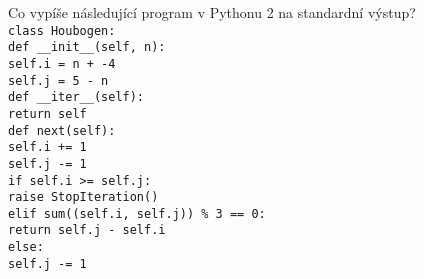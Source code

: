 \documentclass[addpoints,12pt]{exam}
\begin{document}
\begin{questions}
\begin{choices}
\end{choices}
\question[2]
Co vypíše následující program v Pythonu 2 na standardní výstup?\\
\texttt{class Houbogen:\\
\hspace*{0.6cm}def \_{}\_{}init\_{}\_{}(self, n):\\
\hspace*{0.6cm}\hspace*{0.6cm}self.i = n + -4\\
\hspace*{0.6cm}\hspace*{0.6cm}self.j = 5 - n\\
\hspace*{0.6cm}def \_{}\_{}iter\_{}\_{}(self):\\
\hspace*{0.6cm}\hspace*{0.6cm}return self\\
\hspace*{0.6cm}def next(self):\\
\hspace*{0.6cm}\hspace*{0.6cm}self.i += 1\\
\hspace*{0.6cm}\hspace*{0.6cm}self.j -= 1\\
\hspace*{0.6cm}\hspace*{0.6cm}if self.i \textgreater{}= self.j:\\
\hspace*{0.6cm}\hspace*{0.6cm}\hspace*{0.6cm}raise StopIteration()\\
\hspace*{0.6cm}\hspace*{0.6cm}elif sum((self.i, self.j)) \%{} 3 == 0:\\
\hspace*{0.6cm}\hspace*{0.6cm}\hspace*{0.6cm}return self.j - self.i\\
\hspace*{0.6cm}\hspace*{0.6cm}else:\\
\hspace*{0.6cm}\hspace*{0.6cm}\hspace*{0.6cm}self.j -= 1\\
}
\end{questions}
\end{document}
